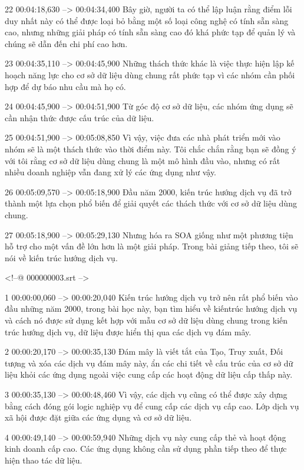 22
00:04:18,630 --> 00:04:34,400
Bây giờ, người ta có thể lập luận rằng điểm lỗi duy nhất này có thể được loại bỏ bằng một số loại công nghệ có tính sẵn sàng cao, nhưng những giải pháp có tính sẵn sàng cao đó khá phức tạp để quản lý và chúng sẽ dẫn đến chi phí cao hơn.

23
00:04:35,110 --> 00:04:45,900
Những thách thức khác là việc thực hiện lập kế hoạch năng lực cho cơ sở dữ liệu dùng chung rất phức tạp vì các nhóm cần phối hợp để dự báo nhu cầu mà họ có.

24
00:04:45,900 --> 00:04:51,900
Từ góc độ cơ sở dữ liệu, các nhóm ứng dụng sẽ cần nhận thức được cấu trúc của dữ liệu.

25
00:04:51,900 --> 00:05:08,850
Vì vậy, việc đưa các nhà phát triển mới vào nhóm sẽ là một thách thức vào thời điểm này.  Tôi chắc chắn rằng bạn sẽ đồng ý với tôi rằng cơ sở dữ liệu dùng chung là một mô hình đầu vào, nhưng có rất nhiều doanh nghiệp vẫn đang xử lý các ứng dụng như vậy.

26
00:05:09,570 --> 00:05:18,900
Đầu năm 2000, kiến ​​trúc hướng dịch vụ đã trở thành một lựa chọn phổ biến để giải quyết các thách thức với cơ sở dữ liệu dùng chung.

27
00:05:18,900 --> 00:05:29,130
Nhưng hóa ra SOA giống như một phương tiện hỗ trợ cho một vấn đề lớn hơn là một giải pháp.  Trong bài giảng tiếp theo, tôi sẽ nói về kiến ​​trúc hướng dịch vụ.

<!--@ 000000003.srt -->

1
00:00:00,060 --> 00:00:20,040
Kiến trúc hướng dịch vụ trở nên rất phổ biến vào đầu những năm 2000, trong bài học này, bạn tìm hiểu về kiến ​​trúc hướng dịch vụ và cách nó được sử dụng kết hợp với mẫu cơ sở dữ liệu dùng chung trong kiến ​​trúc hướng dịch vụ, dữ liệu được hiển thị qua các dịch vụ đám mây.

2
00:00:20,170 --> 00:00:35,130
Đám mây là viết tắt của Tạo, Truy xuất, Đối tượng và xóa các dịch vụ đám mây này, ẩn các chi tiết về cấu trúc của cơ sở dữ liệu khỏi các ứng dụng ngoài việc cung cấp các hoạt động dữ liệu cấp thấp này.

3
00:00:35,130 --> 00:00:48,460
Vì vậy, các dịch vụ cũng có thể được xây dựng bằng cách đóng gói logic nghiệp vụ để cung cấp các dịch vụ cấp cao.  Lớp dịch vụ xã hội được đặt giữa các ứng dụng và cơ sở dữ liệu.

4
00:00:49,140 --> 00:00:59,940
Những dịch vụ này cung cấp thẻ và hoạt động kinh doanh cấp cao.  Các ứng dụng không cần sử dụng phần tiếp theo để thực hiện thao tác dữ liệu.

